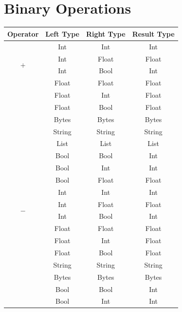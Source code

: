 \documentclass[12pt, titlepage]{article}
\begin{document}
\newpage
\appendix

\newpage
\section{\\Binary Operations} \label{App:AppendixBinary}

\begin{longtable}{ |c |c |c |c | }
	\hline
	\textbf{Operator} & \textbf{Left Type} & \textbf{Right Type} & \textbf{Result Type} \\ \hline
	\multirow{4}{*}{$+$} & Int & Int & Int \\
						 & Int & Float & Float \\
						 & Int & Bool & Int \\
	                     & Float & Float & Float \\
	                     & Float & Int & Float \\
	                     & Float & Bool & Float \\
	                     & Bytes & Bytes & Bytes \\
	                     & String & String & String \\
	                     & List & List & List \\ 
	                     & Bool & Bool & Int \\
	                     & Bool & Int & Int \\
	                     & Bool & Float & Float \\
	                     \hline
	\multirow{4}{*}{$-$} & Int & Int & Int \\
	                     & Int & Float & Float \\
	                     & Int & Bool & Int \\
	                     & Float & Float & Float \\
	                     & Float & Int & Float \\
	                     & Float & Bool & Float \\
	                     & String & String & String \\
	                     & Bytes & Bytes & Bytes \\
	                     & Bool & Bool & Int \\
	                     & Bool & Int & Int \\

\end{longtable}
\end{document}
